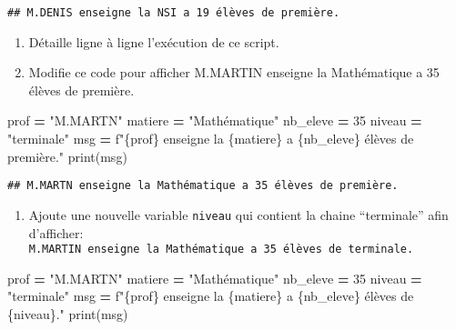 \documentclass[
]{book}
\newenvironment{Shaded}{\begin{snugshade}}{\end{snugshade}}
\newcommand{\BuiltInTok}[1]{#1}
\newcommand{\DecValTok}[1]{\textcolor[rgb]{0.00,0.00,0.81}{#1}}
\newcommand{\NormalTok}[1]{#1}
\newcommand{\OperatorTok}[1]{\textcolor[rgb]{0.81,0.36,0.00}{\textbf{#1}}}
\newcommand{\SpecialCharTok}[1]{\textcolor[rgb]{0.00,0.00,0.00}{#1}}
\newcommand{\SpecialStringTok}[1]{\textcolor[rgb]{0.31,0.60,0.02}{#1}}
\newcommand{\StringTok}[1]{\textcolor[rgb]{0.31,0.60,0.02}{#1}}
\providecommand{\tightlist}{%
  \setlength{\itemsep}{0pt}\setlength{\parskip}{0pt}}
\def\tightlist{}
\begin{document}
\begin{verbatim}
## M.DENIS enseigne la NSI a 19 élèves de première.
\end{verbatim}

\begin{enumerate}
\def\labelenumi{\arabic{enumi}.}
\setcounter{enumi}{1}
\tightlist
\item
  Détaille ligne à ligne l'exécution de ce script.
\item
  Modifie ce code pour afficher M.MARTIN enseigne la Mathématique a 35 élèves de première.
\end{enumerate}

\begin{Shaded}
\begin{Highlighting}[]
\NormalTok{prof }\OperatorTok{=} \StringTok{"M.MARTN"}
\NormalTok{matiere }\OperatorTok{=} \StringTok{"Mathématique"}
\NormalTok{nb\_eleve }\OperatorTok{=} \DecValTok{35}
\NormalTok{niveau }\OperatorTok{=} \StringTok{"terminale"}
\NormalTok{msg }\OperatorTok{=} \SpecialStringTok{f"}\SpecialCharTok{\{}\NormalTok{prof}\SpecialCharTok{\}}\SpecialStringTok{ enseigne la }\SpecialCharTok{\{}\NormalTok{matiere}\SpecialCharTok{\}}\SpecialStringTok{ a }\SpecialCharTok{\{}\NormalTok{nb\_eleve}\SpecialCharTok{\}}\SpecialStringTok{ élèves de première."} 
\BuiltInTok{print}\NormalTok{(msg)}
\end{Highlighting}
\end{Shaded}

\begin{verbatim}
## M.MARTN enseigne la Mathématique a 35 élèves de première.
\end{verbatim}

\begin{enumerate}
\def\labelenumi{\arabic{enumi}.}
\setcounter{enumi}{3}
\tightlist
\item
  Ajoute une nouvelle variable \texttt{niveau} qui contient la chaine ``terminale'' afin d'afficher: \texttt{M.MARTIN\ enseigne\ la\ Mathématique\ a\ 35\ élèves\ de\ terminale.}
\end{enumerate}

\begin{Shaded}
\begin{Highlighting}[]
\NormalTok{prof }\OperatorTok{=} \StringTok{"M.MARTN"}
\NormalTok{matiere }\OperatorTok{=} \StringTok{"Mathématique"}
\NormalTok{nb\_eleve }\OperatorTok{=} \DecValTok{35}
\NormalTok{niveau }\OperatorTok{=} \StringTok{"terminale"}
\NormalTok{msg }\OperatorTok{=} \SpecialStringTok{f"}\SpecialCharTok{\{}\NormalTok{prof}\SpecialCharTok{\}}\SpecialStringTok{ enseigne la }\SpecialCharTok{\{}\NormalTok{matiere}\SpecialCharTok{\}}\SpecialStringTok{ a }\SpecialCharTok{\{}\NormalTok{nb\_eleve}\SpecialCharTok{\}}\SpecialStringTok{ élèves de }\SpecialCharTok{\{}\NormalTok{niveau}\SpecialCharTok{\}}\SpecialStringTok{."} 
\BuiltInTok{print}\NormalTok{(msg)}
\end{Highlighting}
\end{Shaded}
\end{document}
